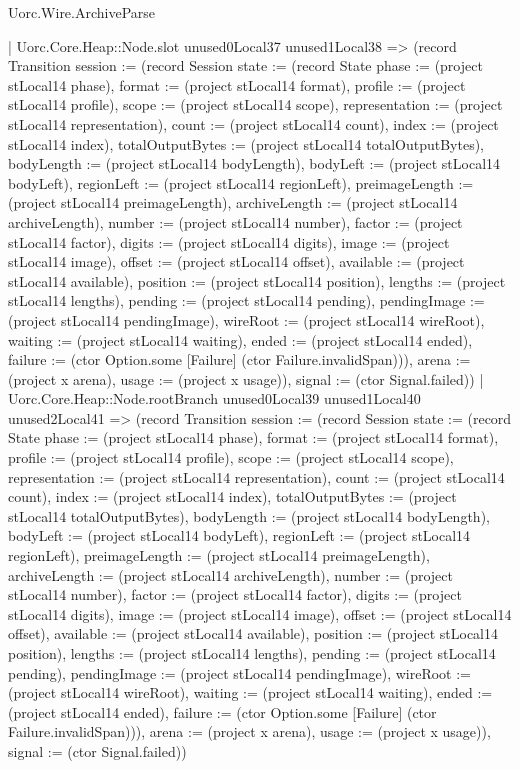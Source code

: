 \begin{lexlean}{Uorc.Wire.ArchiveParse}
\begin{semanticmodule}
{            | Uorc.Core.Heap::Node.slot unused0Local37 unused1Local38 => (record Transition {session := (record Session {state := (record State {phase := (project stLocal14 phase), format := (project stLocal14 format), profile := (project stLocal14 profile), scope := (project stLocal14 scope), representation := (project stLocal14 representation), count := (project stLocal14 count), index := (project stLocal14 index), totalOutputBytes := (project stLocal14 totalOutputBytes), bodyLength := (project stLocal14 bodyLength), bodyLeft := (project stLocal14 bodyLeft), regionLeft := (project stLocal14 regionLeft), preimageLength := (project stLocal14 preimageLength), archiveLength := (project stLocal14 archiveLength), number := (project stLocal14 number), factor := (project stLocal14 factor), digits := (project stLocal14 digits), image := (project stLocal14 image), offset := (project stLocal14 offset), available := (project stLocal14 available), position := (project stLocal14 position), lengths := (project stLocal14 lengths), pending := (project stLocal14 pending), pendingImage := (project stLocal14 pendingImage), wireRoot := (project stLocal14 wireRoot), waiting := (project stLocal14 waiting), ended := (project stLocal14 ended), failure := (ctor Option.some [Failure] (ctor Failure.invalidSpan))}), arena := (project x arena), usage := (project x usage)}), signal := (ctor Signal.failed)})
            | Uorc.Core.Heap::Node.rootBranch unused0Local39 unused1Local40 unused2Local41 => (record Transition {session := (record Session {state := (record State {phase := (project stLocal14 phase), format := (project stLocal14 format), profile := (project stLocal14 profile), scope := (project stLocal14 scope), representation := (project stLocal14 representation), count := (project stLocal14 count), index := (project stLocal14 index), totalOutputBytes := (project stLocal14 totalOutputBytes), bodyLength := (project stLocal14 bodyLength), bodyLeft := (project stLocal14 bodyLeft), regionLeft := (project stLocal14 regionLeft), preimageLength := (project stLocal14 preimageLength), archiveLength := (project stLocal14 archiveLength), number := (project stLocal14 number), factor := (project stLocal14 factor), digits := (project stLocal14 digits), image := (project stLocal14 image), offset := (project stLocal14 offset), available := (project stLocal14 available), position := (project stLocal14 position), lengths := (project stLocal14 lengths), pending := (project stLocal14 pending), pendingImage := (project stLocal14 pendingImage), wireRoot := (project stLocal14 wireRoot), waiting := (project stLocal14 waiting), ended := (project stLocal14 ended), failure := (ctor Option.some [Failure] (ctor Failure.invalidSpan))}), arena := (project x arena), usage := (project x usage)}), signal := (ctor Signal.failed)})
}
\end{semanticmodule}
\end{lexlean}
